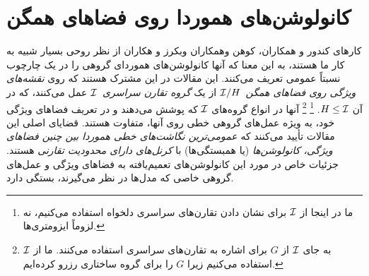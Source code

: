 

\section{کانولوشن‌های هموردا روی فضاهای همگن}
\label{apx:homogeneous_conv}

کارهای کندور و همکاران\cite{Kondor2018-GENERAL}، کوهن وهمکاران\cite{Cohen2018-intertwiners}\cite{Cohen2019-generaltheory} وبکرز و هکاران \cite{bekkers2020bspline} از نظر روحی بسیار شبیه به کار ما هستند، به این معنا که آنها کانولوشن‌های هموردای گروهی را در یک چارچوب نسبتاً عمومی تعریف می‌کنند.
این مقالات در این مشترک هستند که روی \emph{نقشه‌های ویژگی روی فضاهای همگن}~$\mathcal{I}/H$ از یک \emph{گروه تقارن سراسری}~$\mathcal{I}$ عمل می‌کنند، که در آن $H\leq\mathcal{I}$.%
\footnote{
	ما در اینجا از $\mathcal{I}$ برای نشان دادن تقارن‌های سراسری دلخواه استفاده می‌کنیم، نه لزوماً ایزومتری‌ها.
}%
\footnote{
	\cite{Kondor2018-GENERAL,Cohen2019-generaltheory,bekkers2020bspline} به جای $\mathcal{I}$ از $G$ برای اشاره به تقارن‌های سراسری استفاده می‌کنند.
	ما از $\mathcal{I}$ استفاده می‌کنیم زیرا $G$ را برای گروه ساختاری رزرو کرده‌ایم.
}
آنها در انواع گروه‌های $\mathcal{I}$ که پوشش می‌دهند و در تعریف فضاهای ویژگی خود، به ویژه عمل‌های گروهی خطی روی آنها، متفاوت هستند.
قضایای اصلی این مقالات تأیید می‌کنند که \emph{عمومی‌ترین نگاشت‌های خطی هموردا بین چنین فضاهای ویژگی، کانولوشن‌ها} (یا همبستگی‌ها) با \emph{کرنل‌های دارای محدودیت تقارنی} هستند.
جزئیات خاص در مورد این کانولوشن‌های تعمیم‌یافته به فضاهای ویژگی و عمل‌های گروهی خاصی که مدل‌ها در نظر می‌گیرند، بستگی دارد.

